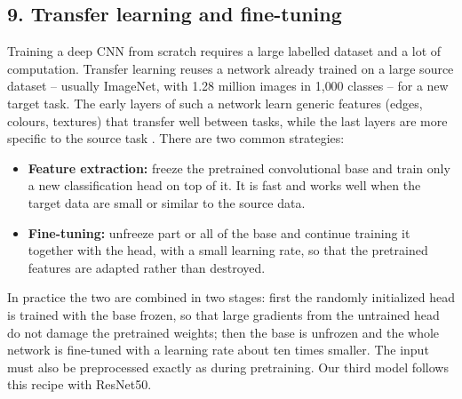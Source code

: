 \documentclass[12pt,letterpaper]{article}
\begin{document}
\subsection{9. Transfer learning and fine-tuning}
Training a deep CNN from scratch requires a large labelled dataset and a lot of computation. Transfer learning reuses
a network already trained on a large source dataset -- usually ImageNet, with 1.28 million images in 1{,}000 classes
\cite{deng2009} -- for a new target task. The early layers of such a network learn generic features (edges, colours,
textures) that transfer well between tasks, while the last layers are more specific to the source task
\cite{yosinski2014}. There are two common strategies:
\begin{itemize}
  \item \textbf{Feature extraction:} freeze the pretrained convolutional base and train only a new classification head
        on top of it. It is fast and works well when the target data are small or similar to the source data.
  \item \textbf{Fine-tuning:} unfreeze part or all of the base and continue training it together with the head, with a
        small learning rate, so that the pretrained features are adapted rather than destroyed.
\end{itemize}
In practice the two are combined in two stages: first the randomly initialized head is trained with the base frozen,
so that large gradients from the untrained head do not damage the pretrained weights; then the base is unfrozen and
the whole network is fine-tuned with a learning rate about ten times smaller. The input must also be preprocessed
exactly as during pretraining. Our third model follows this recipe with ResNet50.
\end{document}

